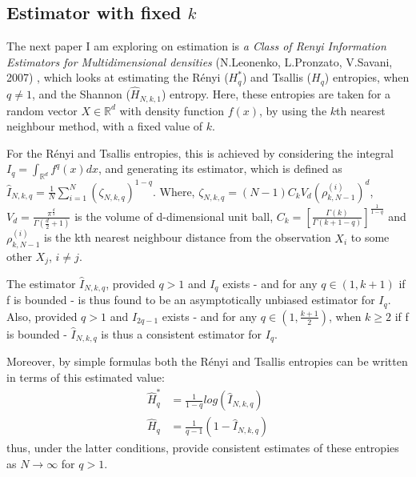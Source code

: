 \documentclass[12pt]{report}
\begin{document}
\subsection{Estimator with fixed $k$} \label{fixed_k}

The next paper I am exploring on estimation is \textit{a Class of Renyi Information Estimators for Multidimensional densities} (N.Leonenko, L.Pronzato, V.Savani, 2007) \cite{paper2}, which looks at estimating the R\'enyi ($H_{q}^{*}$) and Tsallis ($H_{q}$) entropies, when $q \neq 1$, and the Shannon ($\hat{H}_{N, k, 1}$) entropy. Here, these entropies are taken for a random vector $X \in \mathbb{R}^d$ with density function $f(x)$, by using the $k$th nearest neighbour method, with a fixed value of $k$. 

For the R\'enyi and Tsallis entropies, this is achieved by considering the integral  $I_{q} = \int_{\mathbb{R}^d} f^q (x) dx$, and generating its estimator, which is defined as $\hat{I}_{N, k, q} = \frac{1}{N} \sum_{i=1}^{N} (\zeta_{N, k, q})^{1-q}$. Where, $\zeta_{N, k ,q} = (N-1)C_{k}V_{d}(\rho_{k, N-1}^{(i)})^d$,  $V_{d} = \frac{\pi^{\frac{d}{2}}}{\Gamma(\frac{d}{2} + 1 )}$ is the volume of d-dimensional unit ball, $C_{k} = \left[ \frac{\Gamma(k)}{\Gamma(k+1-q)} \right]^{\frac{1}{1-q}}$ and $\rho_{k, N-1}^{(i)}$ is the kth nearest neighbour distance from the observation $X_{i}$ to some other $X_{j}$, $i \neq j$.

The estimator $\hat{I}_{N, k, q}$, provided $q>1$ and $I_{q}$ exists - and for any $q \in (1, k+1)$ if f is bounded - is thus found to be an asymptotically unbiased estimator for $I_{q}$. Also, provided  $q>1$ and $I_{2q-1}$ exists -  and for any $q \in (1, \frac{k+1}{2})$, when $k \geq 2$ if f is bounded - $\hat{I}_{N, k, q}$ is thus a consistent estimator for $I_{q}$.

Moreover, by simple formulas both the R\'enyi and Tsallis entropies can be written in terms of this estimated value:
\begin{align}
\hat{H}_{q}^{*} &= \frac{1}{1-q} log(\hat{I}_{N, k, q}) \\
\hat{H}_{q} &= \frac{1}{q-1} (1 - \hat{I}_{N, k, q})
\end{align}
thus, under the latter conditions, provide consistent estimates of these entropies as $N \to \infty$ for $q > 1$.
\end{document}

